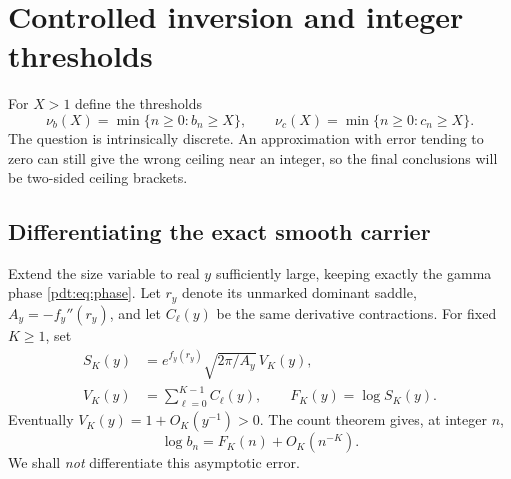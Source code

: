 \section{Controlled inversion and integer thresholds}
\label{pdt:sec:inverse}
For $X>1$ define the thresholds
\begin{equation}\label{pdt:eq:thresholds}
 \nu_b(X)=\min\{n\ge0:b_n\ge X\},\qquad
 \nu_c(X)=\min\{n\ge0:c_n\ge X\}.
\end{equation}
The question is intrinsically discrete. An approximation with error tending to zero can still give the wrong ceiling near an integer, so the final conclusions will be two-sided ceiling brackets.

\subsection{Differentiating the exact smooth carrier}
Extend the size variable to real $y$ sufficiently large, keeping exactly the gamma phase \eqref{pdt:eq:phase}. Let $r_y$ denote its unmarked dominant saddle, $A_y=-f_y''(r_y)$, and let $C_\ell(y)$ be the same derivative contractions. For fixed $K\ge1$, set
\begin{equation}\label{pdt:eq:smoothcarrier}
 \begin{split}
 S_K(y)&=e^{f_y(r_y)}\sqrt{2\pi/A_y}\,V_K(y),\\
 V_K(y)&=\sum_{\ell=0}^{K-1}C_\ell(y),\qquad F_K(y)=\log S_K(y).
 \end{split}
\end{equation}
Eventually $V_K(y)=1+O_K(y^{-1})>0$. The count theorem gives, at integer $n$,
\begin{equation}\label{pdt:eq:logerror}
 \log b_n=F_K(n)+O_K(n^{-K}).
\end{equation}
We shall \emph{not} differentiate this asymptotic error.

